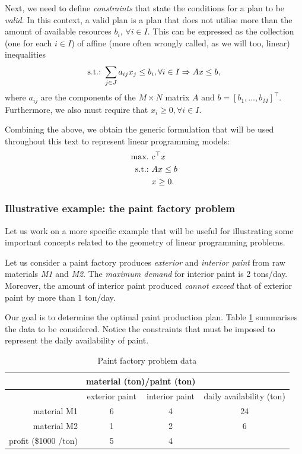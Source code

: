 Next, we need to define \emph{constraints} that state the conditions for a plan to be \emph{valid}. In this context, a valid plan is a plan that does not utilise more than the amount of available resources $b_i$, $\forall i \in I$. This can be expressed as the collection (one for each $i \in I$) of affine (more often wrongly called, as we will too, linear) inequalities
%
\begin{equation*}
	\mathop{\text{s.t.:~}} \sum_{j \in J} a_{ij}x_j \leq b_i, \forall i \in I	\Rightarrow	Ax \leq b,
\end{equation*}
%
where $a_{ij}$ are the components of the $M \times N$ matrix $A$ and $b = [b_1,\dots, b_M]^\top$. Furthermore, we also must require that $x_i \geq 0, \forall i \in I$.                                                                                                         

Combining the above, we obtain the generic formulation that will be used throughout this text to represent linear programming models:
%
\begin{align}
	\mathop{\text{max.~}} & c^\top x  \label{p1c1:eq:LP_objective} \\
	\mathop{\text{s.t.:~}}   & Ax \leq b \label{p1c1:eq:LP_constraint} \\
		  & x \geq 0. \label{p1c1:eq:LP_domain}
\end{align}
%


\subsubsection{Illustrative example: the paint factory problem}
 
Let us work on a more specific example that will be useful for illustrating some important concepts related to the geometry of linear programming problems.

Let us consider a paint factory produces \emph{exterior} and \emph{interior paint} from raw materials \emph{M1} and \emph{M2}. The \emph{maximum demand} for interior paint is 2 tons/day. Moreover, the amount of interior paint produced \emph{cannot exceed} that of exterior paint by more than 1 ton/day. 

Our goal is to determine the optimal paint production plan. Table \ref{p1c1:tab:paint_factory_problem_data} summarises the data to be considered. Notice the constraints that must be imposed to represent the daily availability of paint.

\begin{table}[h]
	\begin{tabular}{rccc} \hline
	&\multicolumn{2}{c}{material (ton)/paint (ton)}\\ \hline
	& exterior paint & interior paint & daily availability (ton)\\ \hline
	material M1 & 6 & 4 & 24\\
	material M2 & 1 & 2 & 6\\ \hline
	profit (\$1000 /ton) & 5 & 4\\ \hline
	\end{tabular}
	\caption{Paint factory problem data} \label{p1c1:tab:paint_factory_problem_data}
\end{table}

